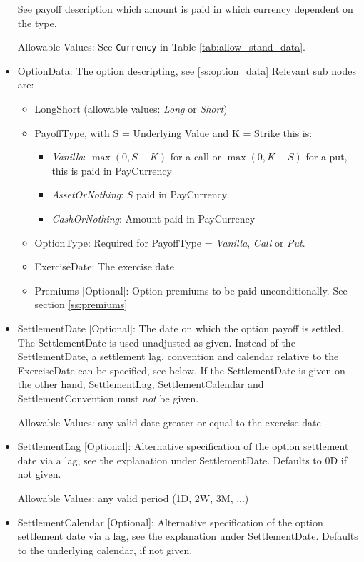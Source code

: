 \begin{itemize}
  See payoff description which amount is paid in which currency dependent on the type.

  Allowable Values: See \lstinline!Currency!  in Table \ref{tab:allow_stand_data}.

\item OptionData: The option descripting, see \ref{ss:option_data} Relevant sub nodes are:
  \begin{itemize}
    \item LongShort (allowable values: \emph{Long} or  \emph{Short})
    \item PayoffType, with S = Underlying Value and K = Strike this is:
      \begin{itemize}
      \item \emph{Vanilla}: $\max(0, S-K)$ for a call or $\max(0, K-S)$ for a put, this is paid in PayCurrency
      \item \emph{AssetOrNothing}: $S$ paid in PayCurrency
      \item \emph{CashOrNothing}: Amount paid in PayCurrency
      \end{itemize}
    \item OptionType: Required for PayoffType = \emph{Vanilla}, \emph{Call} or \emph{Put}.
    \item ExerciseDate: The exercise date
    \item Premiums [Optional]: Option premiums to be paid unconditionally. See section \ref{ss:premiums}
  \end{itemize}

\item SettlementDate [Optional]: The date on which the option payoff is settled. The SettlementDate is used unadjusted
  as given. Instead of the SettlementDate, a settlement lag, convention and calendar relative to the ExerciseDate can be
  specified, see below. If the SettlementDate is given on the other hand, SettlementLag, SettlementCalendar and
  SettlementConvention must {\em not} be given.

  Allowable Values: any valid date greater or equal to the exercise date

\item SettlementLag [Optional]: Alternative specification of the option settlement date via a lag, see the explanation
  under SettlementDate. Defaults to 0D if not given.

  Allowable Values: any valid period (1D, 2W, 3M, ...)

\item SettlementCalendar [Optional]: Alternative specification of the option settlement date via a lag, see the
  explanation under SettlementDate. Defaults to the underlying calendar, if not given.


\end{itemize}
